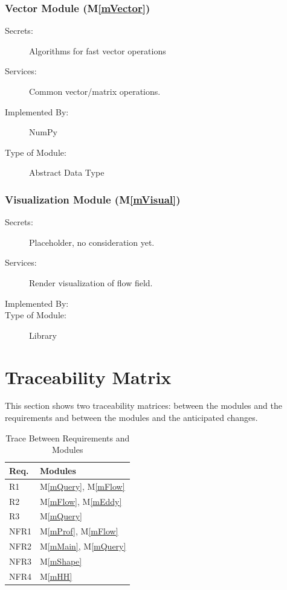 \documentclass[12pt, titlepage]{article}
\newcommand{\mref}[1]{M\ref{#1}}
\begin{document}
\subsubsection{Vector Module (\mref{mVector})}
\begin{description}
\item[Secrets:]Algorithms for fast vector operations
\item[Services:]Common vector/matrix operations.
\item[Implemented By:] NumPy
\item[Type of Module:] Abstract Data Type
\end{description}

\subsubsection{Visualization Module (\mref{mVisual})}
\begin{description}
\item[Secrets:]Placeholder, no consideration yet.
\item[Services:]Render visualization of flow field.
\item[Implemented By:] \progname{}
\item[Type of Module:] Library
\end{description}

\section{Traceability Matrix} \label{SecTM}

This section shows two traceability matrices: between the modules and the
requirements and between the modules and the anticipated changes.

\begin{table}[H]
\centering
\begin{tabular}{p{} p{}}
\toprule
\textbf{Req.} & \textbf{Modules}\\
\midrule
R1 & \mref{mQuery}, \mref{mFlow}\\
R2 & \mref{mFlow}, \mref{mEddy}\\
R3 & \mref{mQuery}\\
NFR1 & \mref{mProf}, \mref{mFlow}\\
NFR2 & \mref{mMain}, \mref{mQuery}\\
NFR3 & \mref{mShape}\\
NFR4 & \mref{mHH}\\
\bottomrule
\end{tabular}
\caption{Trace Between Requirements and Modules}
\label{TblRT}
\end{table}
\end{document}
